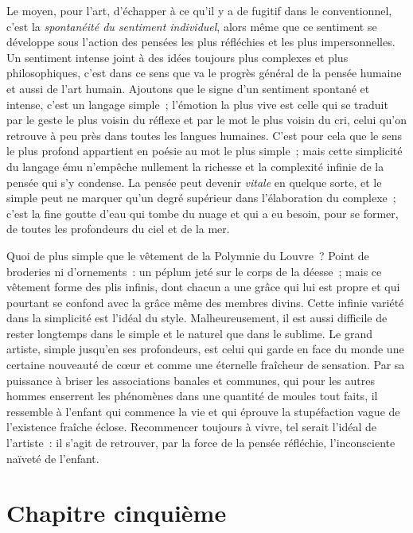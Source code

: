 \documentclass[french,twoside]{book} %
\newcommand\chapteropen{} %
\newcommand\chapterclose{} %
\begin{document}
Le moyen, pour l’art, d’échapper à ce qu’il y a de fugitif dans le conventionnel, c’est la \emph{spontanéité du sentiment individuel}, alors même que ce sentiment se développe sous l’action des pensées les plus réfléchies et les plus impersonnelles. Un sentiment intense joint à des idées toujours plus complexes et plus philosophiques, c’est dans ce sens que va le progrès général de la pensée humaine et aussi de l’art humain. Ajoutons que le signe d’un sentiment spontané et intense, c’est un langage simple ; l’émotion la plus vive est celle qui se traduit par le geste le plus voisin du réflexe et par le mot le plus voisin du cri, celui qu’on retrouve à peu près dans toutes les langues humaines. C’est pour cela que le sens le plus profond appartient en poésie au mot le plus simple ; mais cette simplicité du langage ému n’empêche nullement la richesse et la complexité infinie de la pensée qui s’y condense. La pensée peut devenir \emph{vitale} en quelque sorte, et le simple peut ne marquer qu’un degré supérieur dans l’élaboration du complexe ; c’est la fine goutte d’eau qui tombe du nuage et qui a eu besoin, pour se former, de toutes les profondeurs du ciel et de la mer.\par
Quoi de plus simple que le vêtement de la Polymnie du Louvre ? Point de broderies ni d’ornements : un péplum jeté sur le corps de la déesse ; mais ce vêtement forme des plis infinis, dont chacun a une grâce qui lui est propre et qui pourtant se confond avec la grâce même des membres divins. Cette infinie variété dans la simplicité est l’idéal du style. Malheureusement, il est aussi difficile de rester longtemps dans le simple et le naturel que dans le sublime. Le grand artiste, simple jusqu’en ses profondeurs, est celui qui garde en face du monde une certaine nouveauté de cœur et comme une éternelle fraîcheur de sensation. Par sa puissance à briser les associations banales et communes, qui pour les autres hommes enserrent les phénomènes dans une quantité de moules tout faits, il ressemble à l’enfant qui commence la vie et qui éprouve la stupéfaction vague de l’existence fraîche éclose. Recommencer toujours à vivre, tel serait l’idéal de l’artiste : il s’agit de retrouver, par la force de la pensée réfléchie, l’inconsciente naïveté de l’enfant.
\chapterclose


\chapteropen
\chapter[{Chapitre cinquième}]{Chapitre cinquième}\renewcommand{\leftmark}{Chapitre cinquième}
\end{document}
